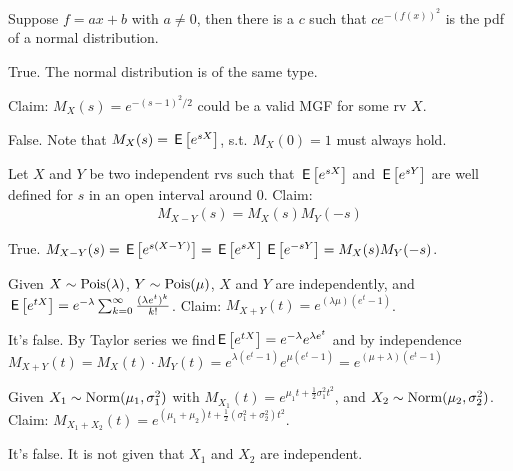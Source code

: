 \documentclass[tf-tutorial-all.tex]{subfiles}
\begin{document}
\begin{truefalse}
Suppose $f = a x + b$ with $a\neq 0$, then there is a $c$ such that $c e^{-(f(x))^2}$ is the pdf of a normal distribution.
\begin{solution}
  True. The normal distribution is of the same type.
\end{solution}
\end{truefalse}


\begin{truefalse}
Claim: $M_X(s)=e^{-(s-1)^2/2}$ could be a valid MGF for some rv $X$.
\begin{solution}
False. Note that $M_X(s)=\,\mathsf{E}\left[e^{sX}\right]$, s.t. $M_X(0)=1$ must always hold.
\end{solution}
\end{truefalse}


\begin{truefalse}
Let $X$ and $Y$ be two independent rvs such that $\,\mathsf{E}\left[e^{s X}\right]$ and $\,\mathsf{E}\left[e^{s Y}\right]$ are well defined for $s$ in an open interval around $0$.
Claim:
\begin{align}
\label{eq:2}
M_{X-Y}(s)=M_X(s)M_Y(-s)
\end{align}
\begin{solution}
True. $M_{X-Y}(s)=\,\mathsf{E}\left[e^{s(X-Y)}\right]=\,\mathsf{E}\left[e^{sX}\right]\,\mathsf{E}\left[e^{-sY}\right]=M_X(s)M_Y(-s)$.
\end{solution}
\end{truefalse}

\begin{truefalse}
Given $X\sim \mathrm{Pois}(\lambda)$, $Y \sim \mathrm{Pois}(\mu)$, $X$ and $Y$ are independently, and $\,\mathsf{E}\left[e^{tX}\right] = e^{-\lambda}\sum^{\infty}_{k=0} \frac{(\lambda e^t)^k}{k!}$.
Claim: $M_{X+Y}(t) = e^{(\lambda \mu)(e^t-1)}$.
\begin{solution}
It's false. By Taylor series we find$ \,\mathsf{E}\left[e^{tX}\right] = e^{-\lambda} e^{\lambda e^t}$ and by independence $M_{X+Y}(t) = M_X(t) \cdot M_Y(t) = e^{\lambda(e^t-1)} e^{\mu(e^t-1)} = e^{(\mu + \lambda)(e^t-1)}$
\end{solution}
\end{truefalse}


\begin{truefalse}
Given $X_1\sim \mathrm{Norm}(\mu_1, \sigma_1^2)$ with $M_{X_1}(t) = e^{\mu_1t + \frac{1}{2}\sigma_1^2t^2}$, and $X_2\sim \mathrm{Norm}(\mu_2, \sigma_2^2)$.
Claim: $M_{X_1+X_2}(t) = e^{(\mu_1 + \mu_2)t +\frac{1}{2}(\sigma_1^2 + \sigma_2^2)t^2}$.
\begin{solution}
It's false. It is not given that $X_1$ and $X_2$ are independent.
\end{solution}
\end{truefalse}
\end{document}
